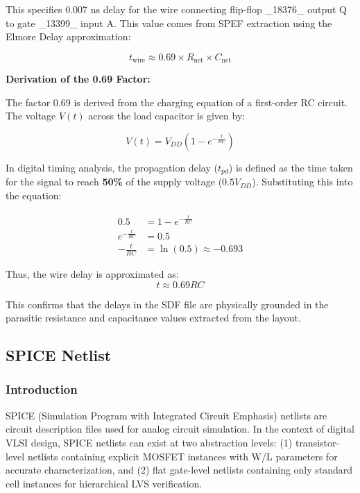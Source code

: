 \documentclass[12pt,a4paper]{article}
\begin{document}
This specifies 0.007 ns delay for the wire connecting flip-flop \_18376\_ output Q to gate \_13399\_ input A. This value comes from SPEF extraction using the Elmore Delay approximation:

\begin{equation}
    t_{\text{wire}} \approx 0.69 \times R_{\text{net}} \times C_{\text{net}}
\end{equation}

\textbf{Derivation of the 0.69 Factor:}

The factor 0.69 is derived from the charging equation of a first-order RC circuit. The voltage $V(t)$ across the load capacitor is given by:

\begin{equation}
    V(t) = V_{DD} \left( 1 - e^{-\frac{t}{RC}} \right)
\end{equation}

In digital timing analysis, the propagation delay ($t_{pd}$) is defined as the time taken for the signal to reach \textbf{50\%} of the supply voltage ($0.5 V_{DD}$). Substituting this into the equation:

\begin{align}
    0.5 &= 1 - e^{-\frac{t}{RC}} \nonumber \\
    e^{-\frac{t}{RC}} &= 0.5 \nonumber \\
    -\frac{t}{RC} &= \ln(0.5) \approx -0.693
\end{align}

Thus, the wire delay is approximated as:
\begin{equation}
    t \approx 0.69 RC
\end{equation}

This confirms that the delays in the SDF file are physically grounded in the parasitic resistance and capacitance values extracted from the layout.

\newpage
\subsection{SPICE Netlist}

\subsubsection{Introduction}

SPICE (Simulation Program with Integrated Circuit Emphasis) netlists are circuit description files used for analog circuit simulation. In the context of digital VLSI design, SPICE netlists can exist at two abstraction levels: (1) transistor-level netlists containing explicit MOSFET instances with W/L parameters for accurate characterization, and (2) flat gate-level netlists containing only standard cell instances for hierarchical LVS verification.
\end{document}
